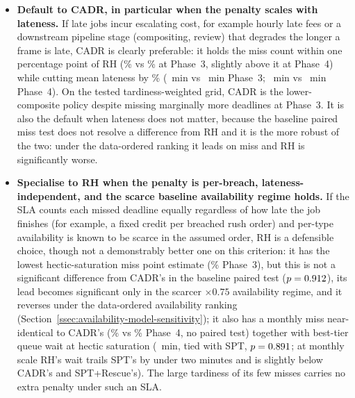 {\begin{itemize}
  \item \textbf{Default to CADR, in particular when the penalty scales with lateness.} If late jobs incur escalating cost, for example hourly late fees or a downstream pipeline stage (compositing, review) that degrades the longer a frame is late, CADR is clearly preferable: it holds the miss count within one percentage point of RH (\CADRmiss\% vs \RHMiss\% at Phase~3, slightly above it at Phase~4) while cutting mean lateness by \CADRtardReduction\% (\CADRtard~min vs \RHtard~min Phase~3; \PhFourCADRTard~min vs \PhFourRHtard~min Phase~4). On the tested tardiness-weighted grid, CADR is the lower-composite policy despite missing marginally more deadlines at Phase~3. It is also the default when lateness does not matter, because the baseline paired miss test does not resolve a difference from RH and it is the more robust of the two: under the data-ordered ranking it leads on miss and RH is significantly worse.
  \item \textbf{Specialise to RH when the penalty is per-breach, lateness-independent, and the scarce baseline availability regime holds.} If the SLA counts each missed deadline equally regardless of how late the job finishes (for example, a fixed credit per breached rush order) and per-type availability is known to be scarce in the assumed order, RH is a defensible choice, though not a demonstrably better one on this criterion: it has the lowest hectic-saturation miss point estimate (\RHMiss\% Phase~3), but this is not a significant difference from CADR's in the baseline paired test ($p=0.912$), its lead becomes significant only in the scarcer $\times 0.75$ availability regime, and it reverses under the data-ordered availability ranking (Section~\ref{ssec:availability-model-sensitivity}); it also has a monthly miss near-identical to CADR's (\PhFourRHMiss\% vs \PhFourCADRMiss\% Phase~4, no paired test) together with best-tier queue wait at hectic saturation (\RHWait~min, tied with SPT, $p=0.891$; at monthly scale RH's wait trails SPT's by under two minutes and is slightly below CADR's and SPT+Rescue's). The large tardiness of its few misses carries no extra penalty under such an SLA.
\end{itemize}

}
